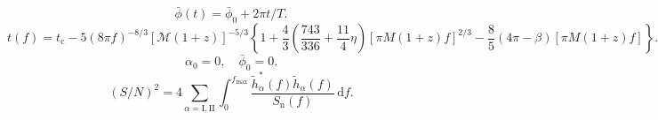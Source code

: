 \documentclass[a3paper]{ctexart}
\def\d{\mathrm{d}}
\begin{document}
    \begin{equation*}
        \bar{\phi}(t)=\bar{\phi}_0+2\pi t/T.
    \end{equation*}
    \begin{equation*}
        t(f)=t_\text{c}-5(8\pi f)^{-8/3}[\mathcal{M}(1+z)]^{-5/3}\left\{1+\frac{4}{3}\left(\frac{743}{336}+\frac{11}{4}\eta\right)\left[\pi M(1+z)f\right]^{2/3}-\frac{8}{5}\left(4\pi-\beta\right)\left[\pi  M(1+z)f\right]\right\}.
    \end{equation*}
    \begin{equation*}
        \alpha_0=0,\quad\bar{\phi}_0=0.
    \end{equation*}
    \begin{equation*}
        (S/N)^2=4\sum_{\alpha=\text{I},\text{II}}\int_{0}^{f_\text{max}}\frac{\tilde{h}_\alpha^*(f)\tilde{h}_\alpha(f)}{S_\text{n}(f)}\,\d f.
    \end{equation*}
\end{document}
